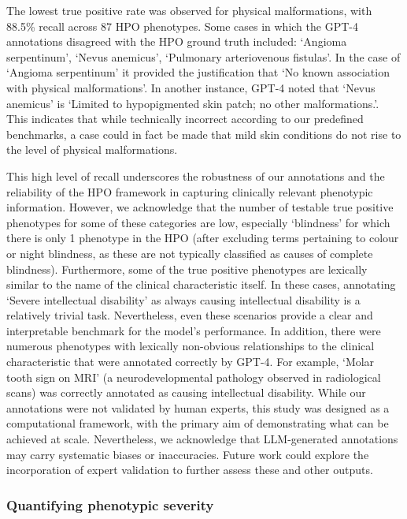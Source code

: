 \documentclass[
]{agujournal2019}
\begin{document}
The lowest true positive rate was observed for physical malformations,
with 88.5\% recall across 87 HPO phenotypes. Some cases in which the
GPT-4 annotations disagreed with the HPO ground truth included: `Angioma
serpentinum', `Nevus anemicus', `Pulmonary arteriovenous fistulas'. In
the case of `Angioma serpentinum' it provided the justification that `No
known association with physical malformations'. In another instance,
GPT-4 noted that `Nevus anemicus' is `Limited to hypopigmented skin
patch; no other malformations.'. This indicates that while technically
incorrect according to our predefined benchmarks, a case could in fact
be made that mild skin conditions do not rise to the level of physical
malformations.

This high level of recall underscores the robustness of our annotations
and the reliability of the HPO framework in capturing clinically
relevant phenotypic information. However, we acknowledge that the number
of testable true positive phenotypes for some of these categories are
low, especially `blindness' for which there is only 1 phenotype in the
HPO (after excluding terms pertaining to colour or night blindness, as
these are not typically classified as causes of complete blindness).
Furthermore, some of the true positive phenotypes are lexically similar
to the name of the clinical characteristic itself. In these cases,
annotating `Severe intellectual disability' as always causing
intellectual disability is a relatively trivial task. Nevertheless, even
these scenarios provide a clear and interpretable benchmark for the
model's performance. In addition, there were numerous phenotypes with
lexically non-obvious relationships to the clinical characteristic that
were annotated correctly by GPT-4. For example, `Molar tooth sign on
MRI' (a neurodevelopmental pathology observed in radiological scans) was
correctly annotated as causing intellectual disability. While our
annotations were not validated by human experts, this study was designed
as a computational framework, with the primary aim of demonstrating what
can be achieved at scale. Nevertheless, we acknowledge that
LLM-generated annotations may carry systematic biases or inaccuracies.
Future work could explore the incorporation of expert validation to
further assess these and other outputs.

\subsubsection{Quantifying phenotypic
severity}\label{quantifying-phenotypic-severity}
\end{document}
